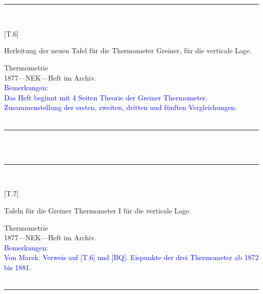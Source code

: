 \\
\vspace*{-2.5pt}\\
\parbox{\textwidth}{%
\rule{\textwidth}{1pt}\vspace*{-3mm}\\
\begin{minipage}[t]{0.2\textwidth}\vspace{0pt}
\Huge\rule[-4mm]{0cm}{1cm}[T.6]
\end{minipage}
\hfill
\begin{minipage}[t]{0.8\textwidth}\vspace{0pt}
\large Herleitung der neuen Tafel für die Thermometer Greiner, für die verticale Lage.\rule[-2mm]{0mm}{2mm}
\end{minipage}
{\footnotesize\flushright
Thermometrie\\
}
1877\quad---\quad NEK\quad---\quad Heft im Archiv.\\
\textcolor{blue}{Bemerkungen:\\{}
Das Heft beginnt mit 4 Seiten {\glqq}Theorie der Greiner Thermometer{\grqq}. Zusammenstellung der ersten, zweiten, dritten und fünften Vergleichungen.\\{}
}
\\[-15pt]
\rule{\textwidth}{1pt}
}
\\
\vspace*{-2.5pt}\\
\parbox{\textwidth}{%
\rule{\textwidth}{1pt}\vspace*{-3mm}\\
\begin{minipage}[t]{0.2\textwidth}\vspace{0pt}
\Huge\rule[-4mm]{0cm}{1cm}[T.7]
\end{minipage}
\hfill
\begin{minipage}[t]{0.8\textwidth}\vspace{0pt}
\large Tafeln für die Greiner Thermometer I für die verticale Lage.\rule[-2mm]{0mm}{2mm}
\end{minipage}
{\footnotesize\flushright
Thermometrie\\
}
1877\quad---\quad NEK\quad---\quad Heft im Archiv.\\
\textcolor{blue}{Bemerkungen:\\{}
Von Marek. Verweis auf [T.6] und [BQ]. Eispunkte der drei Thermometer ab 1872 bis 1881.\\{}
}
\\[-15pt]
\rule{\textwidth}{1pt}
}
